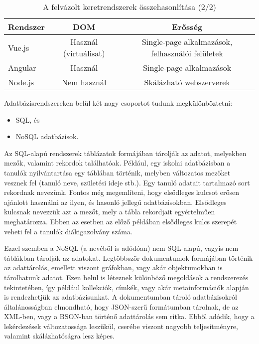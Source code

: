 \begin{table}[h]
\centering
\caption{A felvázolt keretrendszerek összehasonlítása (2/2)}
\label{tab:keretrendszerek2}
\begin{tabular}{|l|c|c|}
\hline
Rendszer & DOM & Erősség\\
\hline
Vue.js & Használ (virtuálisat) & Single-page alkalmazások, felhasználói felületek\\
\hline
Angular & Használ & Single-page alkalmazások\\
\hline
Node.js & Nem használ & Skálázható webszerverek\\
\hline
\end{tabular}
\end{table}



Adatbázisrendszereken belül két nagy csoportot tudunk megkülönböztetni:
\begin{itemize}
\item SQL, és
\item NoSQL adatbázisok.
\end{itemize}
Az SQL-alapú rendszerek táblázatok formájában tárolják az adatot, melyekben mezők, valamint rekordok találhatóak. Például, egy iskolai adatbázisban a tanulók nyilvántartása egy táblában történik, melyben változatos mezőket vesznek fel (tanuló neve, születési ideje stb.). Egy tanuló adatait tartalmazó sort rekordnak nevezünk. Fontos még megemlíteni, hogy elsődleges kulcsot erősen ajánlott használni az ilyen, és hasonló jellegű adatbázisokban. Elsődleges kulcsnak nevezzük azt a mezőt, mely a tábla rekordjait egyértelműen meghatározza. Ebben az esetben az előző példában elsődleges kulcs szerepét veheti fel a tanulók diákigazolvány száma.

Ezzel szemben a NoSQL (a nevéből is adódóan) nem SQL-alapú, vagyis nem táblákban tárolják az adatokat. Legtöbbször dokumentumok formájában történik az adattárolás, emellett viszont gráfokban, vagy akár objektumokban is tárolhatunk adatot. Ezen belül is léteznek különböző megoldások a rendszerezés tekintetében, így például kollekciók, címkék, vagy akár metainformációk alapján is rendezhetjük az adatbázisunkat. A dokumentumban tároló adatbázisokról általánosságban elmondható, hogy JSON-szerű formátumban tárolnak, de az XML-ben, vagy a BSON-ban történő adattárolás sem ritka. Ebből adódik, hogy a lekérdezések változatossága leszűkül, cserébe viszont nagyobb teljesítményre, valamint skálázhatóságra lesz képes.

